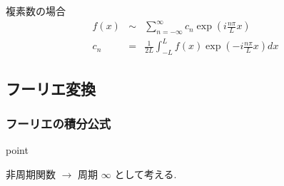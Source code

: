 \documentclass[a4paper]{jsarticle}
\begin{document}
複素数の場合
\begin{eqnarray*}
    f\left(x\right) &\sim& \sum^{\infty}_{n=-\infty} c_n \exp{\left(i \frac{n\pi}{L}x\right)}\\
    c_n &=& \displaystyle\frac{1}{2L}\int^{L}_{-L}f\left(x\right) \exp{\left(-i \frac{n\pi}{L}x\right)} dx
\end{eqnarray*}

\subsection{フーリエ変換}

\subsubsection{フーリエの積分公式}
\begin{itembox}[l]{point}
    \begin{center}
        非周期関数 $\rightarrow$ 周期 $\infty$ として考える.
    \end{center}
\end{itembox}
\end{document}
